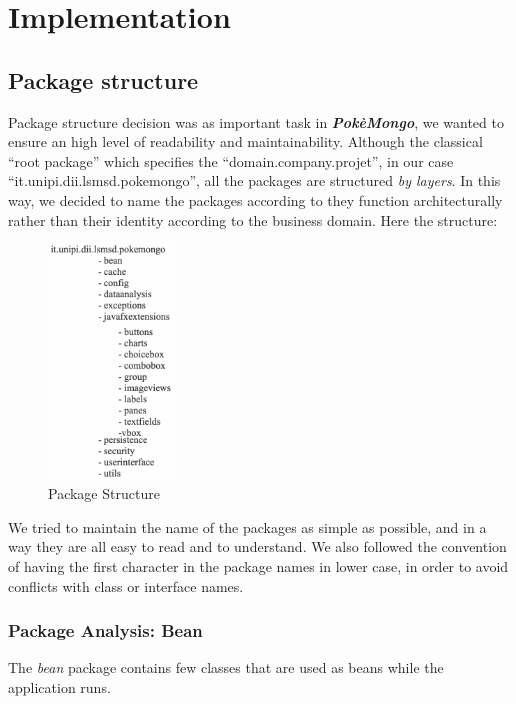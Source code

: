 \section{Implementation}
\subsection{Package structure}
Package structure decision was as important task in \textbf{\textit{PokèMongo}}, we wanted to ensure an high level of readability and maintainability.
Although the classical “root package” which specifies the “domain.company.projet”, in our case “it.unipi.dii.lsmsd.pokemongo”, all the packages are structured \textit{by layers}. In this way, we decided to name the packages according to they function architecturally rather than their identity according to the business domain. Here the structure: 

\begin{figure}[H]
	\centering
	\includegraphics[width= 0.3\textwidth]{img/package_structure.png}
	\caption{Package Structure}
\end{figure}

We tried to maintain the name of the packages as simple as possible, and in a way they are all easy to read and to understand.
We also followed the convention of having the first character in the package names in lower case, in order to avoid conflicts with class or interface names.

\subsubsection{Package Analysis: Bean}
The \textit{bean} package contains few classes that are used as beans while the application runs.

